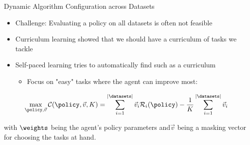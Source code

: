\begin{frame}[c]{Dynamic Algorithm Configuration across Datasets }
	
\begin{itemize}
	\item Challenge: Evaluating a policy on all datasets is often not feasible
	\pause
	\item Curriculum learning  showed that we should have a curriculum of tasks we tackle
	\pause
	\item Self-paced learning  tries to automatically find such as a curriculum
	\begin{itemize}
		\item Focus on "easy" tasks where the agent can improve most:
	\end{itemize}
\end{itemize}
	
\pause
\begin{equation} 
\label{spl_loss}
\max_{\policy,\vec{v}}\mathcal{C}(\policy, \vec{v}, K) = \sum^{|\datasets|}_{i=1} \vec{v}_i\mathcal{R}_i(\policy) - \frac{1}{K} \sum^{|\datasets|}_{i=1} \vec{v}_i \nonumber
\end{equation}

with $\weights$ being the agent's policy parameters and\newline $\vec{v}$ being a masking vector for choosing the tasks at hand.

%
\end{frame}


